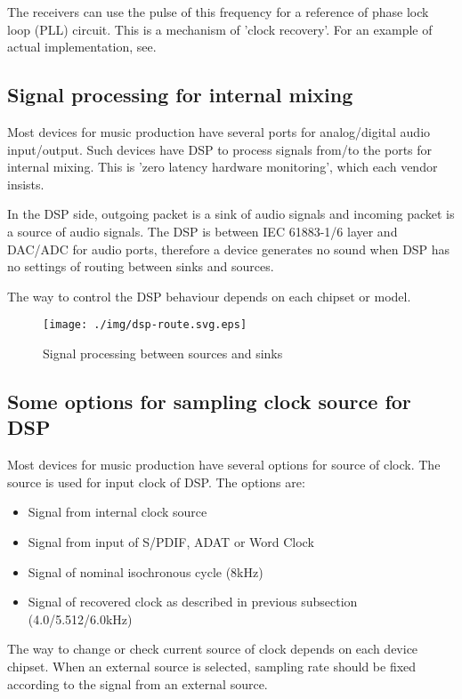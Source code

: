 \documentclass[onecolumn]{article}
\begin{document}
The receivers can use the pulse of this frequency for a reference of phase lock loop (PLL) circuit. This is a mechanism of 'clock recovery'. For an example of actual implementation, see\cite{icelynx}.


\subsection{Signal processing for internal mixing}
\label{sec:internal-mixing}

Most devices for music production have several ports for analog/digital audio input/output. Such devices have DSP to process signals from/to the ports for internal mixing. This is 'zero latency hardware monitoring', which each vendor insists.

In the DSP side, outgoing packet is a sink of audio signals and incoming packet is a source of audio signals. The DSP is between IEC 61883-1/6 layer and DAC/ADC for audio ports, therefore a device generates no sound when DSP has no settings of routing between sinks and sources.

The way to control the DSP behaviour depends on each chipset or model.

\begin{figure}[H]
	\centering
	\texttt{[image: ./img/dsp-route.svg.eps]}
	\caption{{Signal processing between sources and sinks}}
	\label{dsp-route}
\end{figure}

\subsection{Some options for sampling clock source for DSP}

Most devices for music production have several options for source of clock. The source is used for input clock of DSP. The options are:
\begin{itemize}
	\item Signal from internal clock source
	\item Signal from input of S/PDIF, ADAT or Word Clock
	\item Signal of nominal isochronous cycle (8kHz)
	\item Signal of recovered clock as described in previous subsection (4.0/5.512/6.0kHz)
\end{itemize}

The way to change or check current source of clock depends on each device chipset. When an external source is selected, sampling rate should be fixed according to the signal from an external source.
\end{document}
